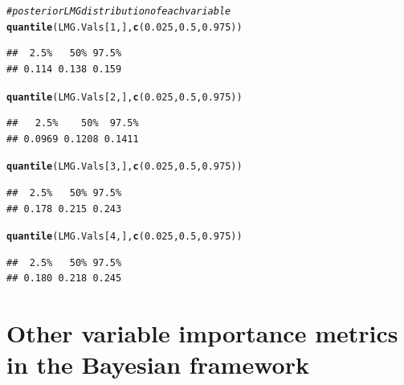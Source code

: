 \documentclass[11pt,a4paper,twoside]{book}\usepackage[]{graphicx}\usepackage[]{color}
\makeatletter
\newcommand{\hlnum}[1]{\textcolor[rgb]{0.686,0.059,0.569}{#1}}%
\newcommand{\hlcom}[1]{\textcolor[rgb]{0.678,0.584,0.686}{\textit{#1}}}%
\newcommand{\hlstd}[1]{\textcolor[rgb]{0.345,0.345,0.345}{#1}}%
\newcommand{\hlkwd}[1]{\textcolor[rgb]{0.737,0.353,0.396}{\textbf{#1}}}%
\newenvironment{kframe}{%
 \def\at@end@of@kframe{}%
 \ifinner\ifhmode%
  \def\at@end@of@kframe{\end{minipage}}%
  \begin{minipage}{\columnwidth}%
 \fi\fi%
 \def\FrameCommand##1{\hskip\@totalleftmargin \hskip-\fboxsep
 \colorbox{shadecolor}{##1}\hskip-\fboxsep
     \hskip-\linewidth \hskip-\@totalleftmargin \hskip\columnwidth}%
 \MakeFramed {\advance\hsize-\width
   \@totalleftmargin\z@ \linewidth\hsize
   \@setminipage}}%
 {\par\unskip\endMakeFramed%
 \at@end@of@kframe}
\newenvironment{knitrout}{}{} %
\makeatother
\begin{document}
\begin{knitrout}
\begin{kframe}
\begin{alltt}
\hlcom{# posterior LMG distribution of each variable}
\hlkwd{quantile}\hlstd{(LMG.Vals[}\hlnum{1}\hlstd{,],} \hlkwd{c}\hlstd{(}\hlnum{0.025}\hlstd{,} \hlnum{0.5}\hlstd{,} \hlnum{0.975}\hlstd{))}
\end{alltt}
\begin{verbatim}
##  2.5%   50% 97.5% 
## 0.114 0.138 0.159
\end{verbatim}
\begin{alltt}
\hlkwd{quantile}\hlstd{(LMG.Vals[}\hlnum{2}\hlstd{,],} \hlkwd{c}\hlstd{(}\hlnum{0.025}\hlstd{,} \hlnum{0.5}\hlstd{,} \hlnum{0.975}\hlstd{))}
\end{alltt}
\begin{verbatim}
##   2.5%    50%  97.5% 
## 0.0969 0.1208 0.1411
\end{verbatim}
\begin{alltt}
\hlkwd{quantile}\hlstd{(LMG.Vals[}\hlnum{3}\hlstd{,],} \hlkwd{c}\hlstd{(}\hlnum{0.025}\hlstd{,} \hlnum{0.5}\hlstd{,} \hlnum{0.975}\hlstd{))}
\end{alltt}
\begin{verbatim}
##  2.5%   50% 97.5% 
## 0.178 0.215 0.243
\end{verbatim}
\begin{alltt}
\hlkwd{quantile}\hlstd{(LMG.Vals[}\hlnum{4}\hlstd{,],} \hlkwd{c}\hlstd{(}\hlnum{0.025}\hlstd{,} \hlnum{0.5}\hlstd{,} \hlnum{0.975}\hlstd{))}
\end{alltt}
\begin{verbatim}
##  2.5%   50% 97.5% 
## 0.180 0.218 0.245
\end{verbatim}
\end{kframe}
\end{knitrout}















\chapter{Other variable importance metrics in the Bayesian framework}
\end{document}
